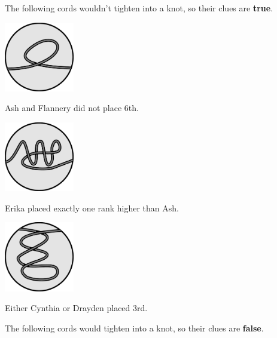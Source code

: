 
The following cords wouldn't tighten into a knot, so their clues are
\textbf{true}.

\begin{multicols}{3}\footnotesize
  \begin{center}
    \includegraphics[width=1.2in]{assets/unknot1.pdf}

    Ash and Flannery did not place 6th.


    \includegraphics[width=1.2in]{assets/unknot2.pdf}

    Erika placed exactly one rank higher than Ash.


    \includegraphics[width=1.2in]{assets/unknot3.pdf}

    Either Cynthia or Drayden placed 3rd.
  \end{center}
\end{multicols}

The following cords would tighten into a knot, so their clues are
\textbf{false}.

